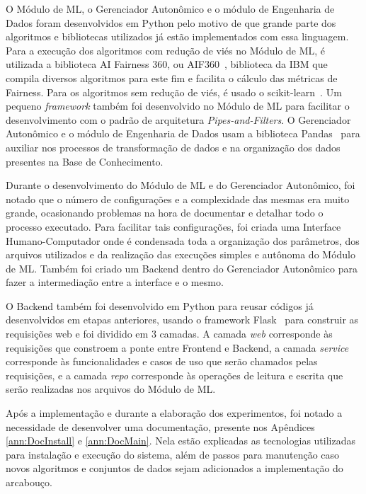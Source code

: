 \documentclass[portugues]{ic-tese}
\begin{document}
O Módulo de ML, o Gerenciador Autonômico e o módulo de Engenharia de Dados foram desenvolvidos em Python pelo motivo de que grande parte dos algoritmos e bibliotecas utilizados já estão implementados com essa linguagem. Para a execução dos algoritmos com redução de viés no Módulo de ML, é utilizada a biblioteca AI Fairness 360, ou AIF360~\citep{AIF360_2022}, biblioteca da IBM que compila diversos algoritmos para este fim e facilita o cálculo das métricas de Fairness. Para os algoritmos sem redução de viés, é usado o scikit-learn~\citep{scikit_2022}. Um pequeno \textit{framework} também foi desenvolvido no Módulo de ML para facilitar o desenvolvimento com o padrão de arquitetura \textit{Pipes-and-Filters}. O Gerenciador Autonômico e o módulo de Engenharia de Dados usam a biblioteca Pandas~\citep{Pandas_2023} para auxiliar nos processos de transformação de dados e na organização dos dados presentes na Base de Conhecimento.

Durante o desenvolvimento do Módulo de ML e do Gerenciador Autonômico, foi notado que o número de configurações e a complexidade das mesmas era muito grande, ocasionando problemas na hora de documentar e detalhar todo o processo executado. Para facilitar tais configurações, foi criada uma Interface Humano-Computador onde é condensada toda a organização dos parâmetros, dos arquivos utilizados e da realização das execuções simples e autônoma do Módulo de ML. Também foi criado um Backend dentro do Gerenciador Autonômico para fazer a intermediação entre a interface e o mesmo.

O Backend também foi desenvolvido em Python para reusar códigos já desenvolvidos em etapas anteriores, usando o framework Flask~\citep{Flask_2023} para construir as requisições web e foi dividido em 3 camadas. A camada \textit{web} corresponde às requisições que constroem a ponte entre Frontend e Backend, a camada \textit{service} corresponde às funcionalidades e casos de uso que serão chamados pelas requisições, e a camada \textit{repo} corresponde às operações de leitura e escrita que serão realizadas nos arquivos do Módulo de ML.

Após a implementação e durante a elaboração dos experimentos, foi notado a necessidade de desenvolver uma documentação, presente nos Apêndices \ref{ann:DocInstall} e \ref{ann:DocMain}. Nela estão explicadas as tecnologias utilizadas para instalação e execução do sistema, além de passos para manutenção caso novos algoritmos e conjuntos de dados sejam adicionados a implementação do arcabouço.
\end{document}
